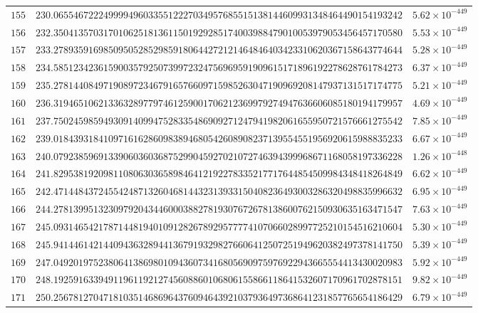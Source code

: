 \documentclass[12pt,reqno]{amsart}
\theoremstyle{remark}
\begin{document}
\begin{longtable}{clc}
$155$ & $230.0655467222499994960335512227034957685515138144609931348464490154193242$ & $5.62\times 10^{-449}$ \\
$156$ & $232.3504135703170106251813611501929285174003988479010053979053456457170580$ & $5.53\times 10^{-449}$ \\
$157$ & $233.2789359169850950528529859180644272121464846403423310620367158643774644$ & $5.28\times 10^{-449}$ \\
$158$ & $234.5851234236159003579250739972324756969591909615171896192278628761784273$ & $6.37\times 10^{-449}$ \\
$159$ & $235.2781440849719089723467916576609715985263047190969208147937131517174775$ & $5.21\times 10^{-449}$ \\
$160$ & $236.3194651062133632897797461259001706212369979274947636606085180194179957$ & $4.69\times 10^{-449}$ \\
$161$ & $237.7502459859493091409947528335486909271247941982061655950721576661275542$ & $7.85\times 10^{-449}$ \\
$162$ & $239.0184393184109716162860983894680542608908237139554551956920615988835233$ & $6.67\times 10^{-449}$ \\
$163$ & $240.0792385969133906036036875299045927021072746394399968671168058197336228$ & $1.26\times 10^{-448}$ \\
$164$ & $241.8295381920981108063036589846412192278335217717644854509984348418264849$ & $6.62\times 10^{-449}$ \\
$165$ & $242.4714484372455424871326046814432313933150408236493003286320498835996632$ & $6.95\times 10^{-449}$ \\
$166$ & $244.2781399513230979204344600038827819307672678138600762150930635163471547$ & $7.63\times 10^{-449}$ \\
$167$ & $245.0931465421787144819401091282678929577774107066028997725210154516210604$ & $5.30\times 10^{-449}$ \\
$168$ & $245.9414461421440943632894413679193298276606412507251949620382497378141750$ & $5.39\times 10^{-449}$ \\
$169$ & $247.0492019752380641386980109436073416805690975976922943665554413430020983$ & $5.92\times 10^{-449}$ \\
$170$ & $248.1925916339491196119212745608860106806155866118641532607170961702878151$ & $9.82\times 10^{-449}$ \\
$171$ & $250.2567812704718103514686964376094643921037936497368641231857765654186429$ & $6.79\times 10^{-449}$ \\

\end{longtable}
\end{document}
